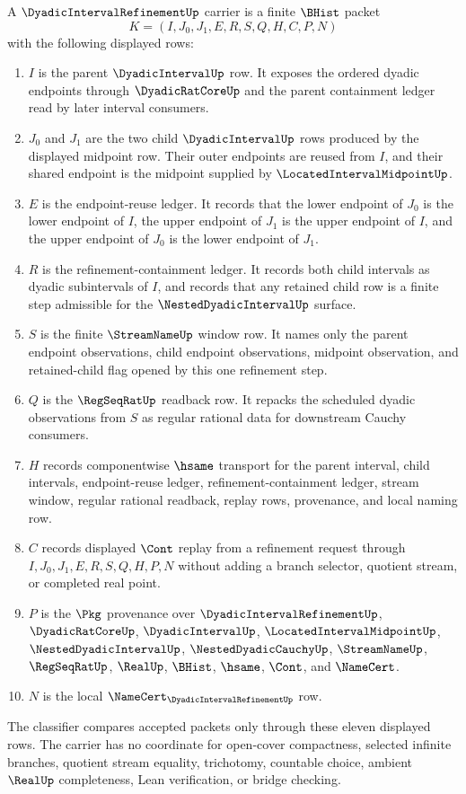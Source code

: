 \begin{definition}
\label{def:dyadic-interval-refinement-carrier}
A $\DyadicIntervalRefinementUp$ carrier is a finite $\BHist$ packet
$$
K=(I,J_0,J_1,E,R,S,Q,H,C,P,N)
$$
with the following displayed rows:
\begin{enumerate}
\item $I$ is the parent $\DyadicIntervalUp$ row. It exposes the ordered dyadic endpoints through $\DyadicRatCoreUp$ and the parent containment ledger read by later interval consumers.
\item $J_0$ and $J_1$ are the two child $\DyadicIntervalUp$ rows produced by the displayed midpoint row. Their outer endpoints are reused from $I$, and their shared endpoint is the midpoint supplied by $\LocatedIntervalMidpointUp$.
\item $E$ is the endpoint-reuse ledger. It records that the lower endpoint of $J_0$ is the lower endpoint of $I$, the upper endpoint of $J_1$ is the upper endpoint of $I$, and the upper endpoint of $J_0$ is the lower endpoint of $J_1$.
\item $R$ is the refinement-containment ledger. It records both child intervals as dyadic subintervals of $I$, and records that any retained child row is a finite step admissible for the $\NestedDyadicIntervalUp$ surface.
\item $S$ is the finite $\StreamNameUp$ window row. It names only the parent endpoint observations, child endpoint observations, midpoint observation, and retained-child flag opened by this one refinement step.
\item $Q$ is the $\RegSeqRatUp$ readback row. It repacks the scheduled dyadic observations from $S$ as regular rational data for downstream Cauchy consumers.
\item $H$ records componentwise $\hsame$ transport for the parent interval, child intervals, endpoint-reuse ledger, refinement-containment ledger, stream window, regular rational readback, replay rows, provenance, and local naming row.
\item $C$ records displayed $\Cont$ replay from a refinement request through $I,J_0,J_1,E,R,S,Q,H,P,N$ without adding a branch selector, quotient stream, or completed real point.
\item $P$ is the $\Pkg$ provenance over $\DyadicIntervalRefinementUp$, $\DyadicRatCoreUp$, $\DyadicIntervalUp$, $\LocatedIntervalMidpointUp$, $\NestedDyadicIntervalUp$, $\NestedDyadicCauchyUp$, $\StreamNameUp$, $\RegSeqRatUp$, $\RealUp$, $\BHist$, $\hsame$, $\Cont$, and $\NameCert$.
\item $N$ is the local $\NameCert_{\DyadicIntervalRefinementUp}$ row.
\end{enumerate}
The classifier compares accepted packets only through these eleven displayed rows. The carrier has no coordinate for open-cover compactness, selected infinite branches, quotient stream equality, trichotomy, countable choice, ambient $\RealUp$ completeness, Lean verification, or bridge checking.
\end{definition}

